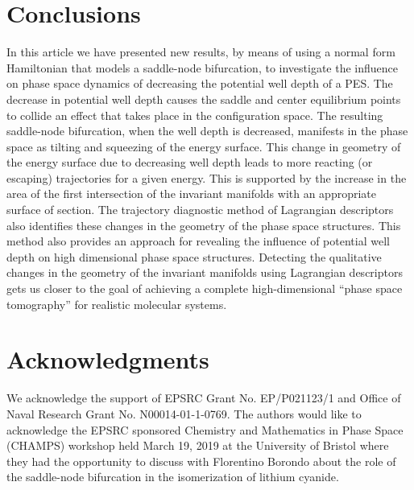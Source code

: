 \documentclass{ws-ijbc}
\begin{document}
\section{Conclusions}
\label{sec:concl}

In this article we have presented new results, by means of using a normal form Hamiltonian that models a saddle-node bifurcation, to investigate the influence on phase space dynamics of decreasing the potential well depth of a PES. The decrease in potential well depth causes the saddle and center equilibrium points to collide \textemdash an effect that takes place in the configuration space. The resulting saddle-node bifurcation, when the well depth is decreased, manifests in the phase space as tilting and squeezing of the energy surface. This change in geometry of the energy surface due to decreasing well depth leads to more reacting (or escaping) trajectories for a given energy. This is supported by the increase in the area of the first intersection of the invariant manifolds with an appropriate surface of section. The trajectory diagnostic method of Lagrangian descriptors also identifies these changes in the geometry of the phase space structures. This method also provides an approach for revealing the influence of potential well depth on high dimensional phase space structures. Detecting the qualitative changes in the geometry of the invariant manifolds using Lagrangian descriptors gets us closer to the goal of achieving a complete high-dimensional ``phase space tomography'' for realistic molecular systems.  


\section*{Acknowledgments}

We acknowledge the support of EPSRC Grant No. EP/P021123/1 and Office of Naval Research Grant No. N00014-01-1-0769. The authors would like to acknowledge the EPSRC sponsored Chemistry and Mathematics in Phase Space (CHAMPS) workshop held March 19, 2019 at the University of Bristol where they had the opportunity to discuss with Florentino Borondo about the role of the saddle-node bifurcation in the isomerization of lithium cyanide.

	
	
% 
% 

\end{document}
